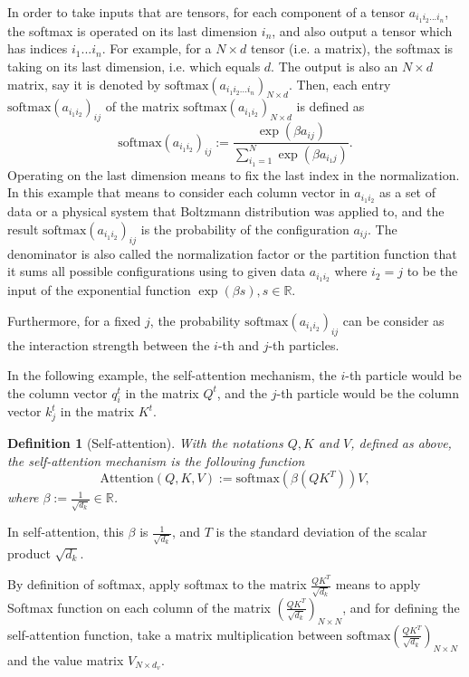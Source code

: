 \documentclass{article}
\theoremstyle{plain}
\theoremstyle{plain} %
\newtheorem{definition}[theorem]{Definition}
\theoremstyle{definition}  %
\theoremstyle{remark}  %
\theoremstyle{plain}
\begin{document}
In order to take inputs that are tensors, for each component of a tensor $a_{i_1i_2...i_n}$, the softmax is operated on its last dimension $i_n$, and also output a tensor which has indices $i_1...i_n$. 
For example, for a $N\times d$ tensor (i.e. a matrix), the softmax is taking on its last dimension, i.e. which equals $d$. The output is also an $N\times d$ matrix, say it is denoted by $\text{softmax}(a_{i_1i_2...i_n})_{N\times d}$. Then, each entry $\text{softmax}(a_{i_1i_2})_{ij}$ of the matrix $\text{softmax}(a_{i_1i_2})_{N\times d}$ is defined as
$$
\text{softmax}(a_{i_1i_2})_{ij}:=\frac{\exp\left(\beta a_{ij} \right) }{\sum\limits_{i_1=1}^N \exp\left(\beta a_{i_1j} \right)}.
$$
Operating on the last dimension means to fix the last index in the normalization. In this example that means to consider each column vector in $a_{i_1i_2}$ as a set of data or a physical system that Boltzmann distribution was applied to, and the result $\text{softmax}(a_{i_1i_2})_{ij}$ is the probability of the configuration $a_{ij}$. The denominator is also called the normalization factor or the partition function that it sums all possible configurations using to given data $a_{i_1i_2}$ where $i_2=j$ to be the input of the exponential function $\exp\left(\beta s \right), s\in\mathbb{R}$.

Furthermore, for a fixed $j$, the probability $\text{softmax}(a_{i_1i_2})_{ij}$ can be consider as the interaction strength between the $i$-th and $j$-th particles. 

In the following example, the self-attention mechanism, the $i$-th particle would be the column vector $q_i^t$ in the matrix $Q^t$, and the $j$-th particle would be the column vector $k^t_j$ in the matrix $K^t$.

\begin{definition}[Self-attention]
With the notations $Q,K$ and $V$, defined as above, \textit{the self-attention mechanism} is the following function
$$
\text{Attention}\left(Q,K,V\right):= \text{softmax}\left(\beta\left( QK^T \right)  \right)  V,
$$
where $\beta:=\frac{1}{\sqrt{d_k}}\in\mathbb{R}$.
\end{definition}




In self-attention, this $\beta$ is $\frac{1}{\sqrt{d_k}}$, and $T$ is the standard deviation of the scalar product $\sqrt{d_k}$.

By definition of softmax, apply softmax to the matrix $\frac{QK^T}{\sqrt{d_k}}$ means to apply Softmax function on each column of the matrix $\left(\frac{QK^T}{\sqrt{d_k}}\right)_{N\times N}$, and for defining the self-attention function, take a matrix multiplication between $\text{softmax}\left(\frac{QK^T}{\sqrt{d_k}} \right)_{N\times N}$ and the value matrix $V_{N \times d_v}$. 
\end{document}
